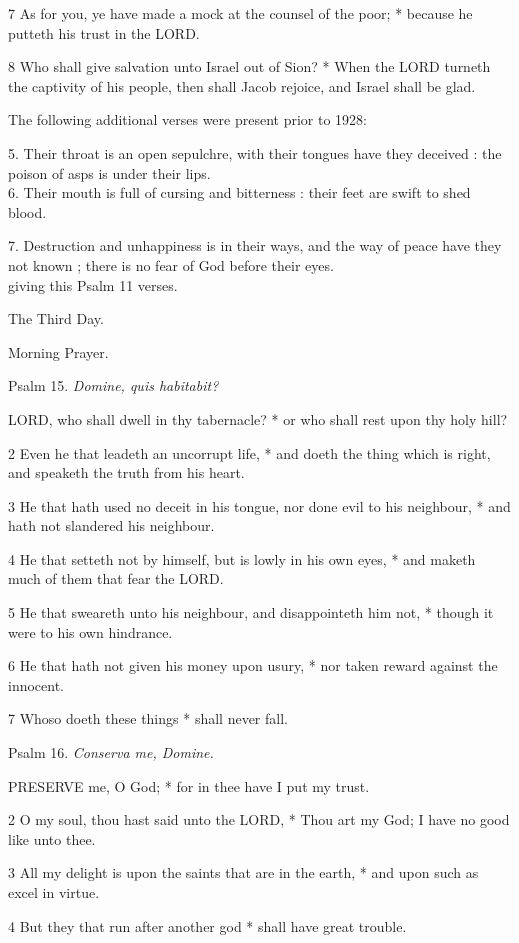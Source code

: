 7 As for you, ye have made a mock at the counsel of
the poor; * because he putteth his trust in the LORD.

8 Who shall give salvation unto Israel out of Sion?
* When the LORD turneth the captivity of his people,
then shall Jacob rejoice, and Israel shall be glad.

The
following additional verses were present prior to 1928: 

5. Their throat is an open sepulchre, with their tongues have they deceived
: the poison of asps is under their lips.\\
6. Their
mouth is full of cursing and bitterness : their feet are swift to shed blood.

7. Destruction and unhappiness is in their ways, and
the way of peace have they not known ; there is no fear of God before their
eyes. \\
giving
this Psalm 11 verses.

The
Third Day.

Morning Prayer.

Psalm
15. \emph{Domine, quis habitabit?}

LORD,
who shall dwell in thy tabernacle? * or who shall rest upon thy holy hill?

2 Even he that leadeth an uncorrupt life, * and doeth
the thing which is right, and speaketh the truth from his heart.

3 He that hath used no deceit in his tongue, nor done
evil to his neighbour, * and hath not slandered his neighbour.

4 He that setteth not by himself, but is lowly in his
own eyes, * and maketh much of them that fear the LORD.

5 He that sweareth unto his neighbour, and disappointeth
him not, * though it were to his own hindrance.

6 He that hath not given his money upon usury, * nor
taken reward against the innocent.

7 Whoso doeth these things * shall never fall.

Psalm
16. \emph{Conserva me, Domine.}

PRESERVE
me, O God; * for in thee have I put my trust.

2 O my soul, thou hast said unto the LORD,
* Thou art my God; I have no good like unto thee.

3 All my delight is upon the saints that are in the
earth, * and upon such as excel in virtue.

4 But they that run after another god * shall have
great trouble.

